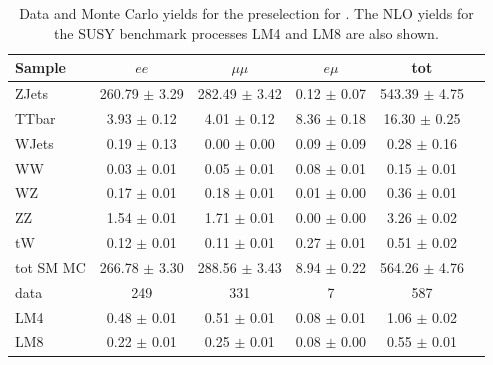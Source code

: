 \begin{table}[htb]
\begin{center}
\caption{\label{preselyieldtable} Data and Monte Carlo yields for the preselection for \lumi. The NLO yields
for the SUSY benchmark processes LM4 and LM8 are also shown.}
\begin{tabular}{lccccc}
\hline
              Sample   &                $ee$   &            $\mu\mu$   &              $e\mu$   &                 tot  \\
\hline
               ZJets   &   260.79 $\pm$ 3.29   &   282.49 $\pm$ 3.42   &     0.12 $\pm$ 0.07   &   543.39 $\pm$ 4.75  \\
               TTbar   &     3.93 $\pm$ 0.12   &     4.01 $\pm$ 0.12   &     8.36 $\pm$ 0.18   &    16.30 $\pm$ 0.25  \\
               WJets   &     0.19 $\pm$ 0.13   &     0.00 $\pm$ 0.00   &     0.09 $\pm$ 0.09   &     0.28 $\pm$ 0.16  \\
                  WW   &     0.03 $\pm$ 0.01   &     0.05 $\pm$ 0.01   &     0.08 $\pm$ 0.01   &     0.15 $\pm$ 0.01  \\
                  WZ   &     0.17 $\pm$ 0.01   &     0.18 $\pm$ 0.01   &     0.01 $\pm$ 0.00   &     0.36 $\pm$ 0.01  \\
                  ZZ   &     1.54 $\pm$ 0.01   &     1.71 $\pm$ 0.01   &     0.00 $\pm$ 0.00   &     3.26 $\pm$ 0.02  \\
                  tW   &     0.12 $\pm$ 0.01   &     0.11 $\pm$ 0.01   &     0.27 $\pm$ 0.01   &     0.51 $\pm$ 0.02  \\
\hline
           tot SM MC   &   266.78 $\pm$ 3.30   &   288.56 $\pm$ 3.43   &     8.94 $\pm$ 0.22   &   564.26 $\pm$ 4.76  \\
\hline
                data   &                 249   &                 331   &                   7   &                 587  \\
\hline
                 LM4   &     0.48 $\pm$ 0.01   &     0.51 $\pm$ 0.01   &     0.08 $\pm$ 0.01   &     1.06 $\pm$ 0.02  \\
                 LM8   &     0.22 $\pm$ 0.01   &     0.25 $\pm$ 0.01   &     0.08 $\pm$ 0.00   &     0.55 $\pm$ 0.01  \\
\hline
\end{tabular}
\end{center}
\end{table}


